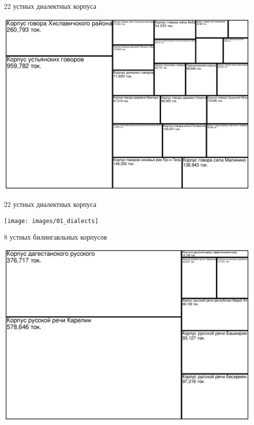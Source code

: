 \documentclass[
  ignorenonframetext,
]{beamer}
\begin{document}
\begin{frame}{22 устных диалектных корпуса}
\protect\hypertarget{ux443ux441ux442ux43dux44bux445-ux434ux438ux430ux43bux435ux43aux442ux43dux44bux445-ux43aux43eux440ux43fux443ux441ux430}{}
\begin{center}\includegraphics[width=0.99\linewidth]{2023.12.14_4nv_files/figure-beamer/unnamed-chunk-3-1} \end{center}
\end{frame}

\begin{frame}{22 устных диалектных корпуса}
\protect\hypertarget{ux443ux441ux442ux43dux44bux445-ux434ux438ux430ux43bux435ux43aux442ux43dux44bux445-ux43aux43eux440ux43fux443ux441ux430-1}{}
\begin{center}\texttt{[image: images/01\_dialects]} \end{center}
\end{frame}

\begin{frame}{8 устных билингавльных корпусов}
\protect\hypertarget{ux443ux441ux442ux43dux44bux445-ux431ux438ux43bux438ux43dux433ux430ux432ux43bux44cux43dux44bux445-ux43aux43eux440ux43fux443ux441ux43eux432}{}
\begin{center}\includegraphics[width=0.99\linewidth]{2023.12.14_4nv_files/figure-beamer/unnamed-chunk-6-1} \end{center}
\end{frame}
\end{document}

